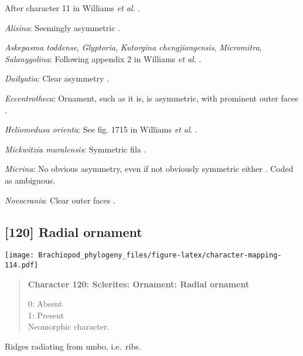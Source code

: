 \documentclass[openany]{book}
\theoremstyle{definition}
\theoremstyle{definition}
\theoremstyle{definition}
\theoremstyle{remark}
\begin{document}
After character 11 in Williams \emph{et al}.
\citeyearpar{Williams1998Thediversity}.

\hypertarget{Alisina-coding-119}{}
\emph{Alisina}: Seemingly asymmetric \citetext{\citealp[fig.
122.3c]{Williams2000LinguliformeaCraniiformea}; \citealp[Fig.
1]{Zhang2011Anobolellate}}.

\hypertarget{Askepasma_toddense-coding-119}{}
\emph{Askepasma toddense}, \emph{Glyptoria}, \emph{Kutorgina
chengjiangensis}, \emph{Micromitra}, \emph{Salanygolina}: Following
appendix 2 in Williams \emph{et al}.
\citeyearpar{Williams1998Thediversity}.

\hypertarget{Dailyatia-coding-119}{}
\emph{Dailyatia}: Clear asymmetry \citep{Skovsted2015Theearly}.

\hypertarget{Eccentrotheca-coding-119}{}
\emph{Eccentrotheca}: Ornament, such as it is, is asymmetric, with
prominent outer faces \citep{Skovsted2011Scleritomeconstruction}.

\hypertarget{Heliomedusa_orienta-coding-119}{}
\emph{Heliomedusa orienta}: See fig. 1715 in Williams \emph{et al}.
\citeyearpar{Williams2007Supplement}.

\hypertarget{Mickwitzia_muralensis-coding-119}{}
\emph{Mickwitzia muralensis}: Symmetric fila
\citep{Balthasar2004Shellstructure}.

\hypertarget{Micrina-coding-119}{}
\emph{Micrina}: No obvious asymmetry, even if not obviously symmetric
either \citep{Holmer2008TheEarly}. Coded as ambiguous.

\hypertarget{Novocrania-coding-119}{}
\emph{Novocrania}: Clear outer faces \citep[fig.
100.2b]{Williams2000LinguliformeaCraniiformea}.

\subsection*{{[}120{]} Radial ornament}\label{radial-ornament}

\texttt{[image: Brachiopod\_phylogeny\_files/figure-latex/character-mapping-114.pdf]}

\begin{quote}
\textbf{Character 120: Sclerites: Ornament: Radial ornament}

0: Absent\\
1: Present\\
Neomorphic character.
\end{quote}

Ridges radiating from umbo, i.e.~ribs.
\end{document}
